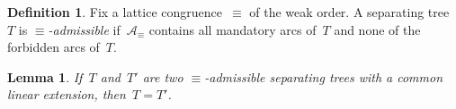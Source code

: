 \documentclass{amsart}
\newtheorem{lemma}[theorem]{Lemma}
\theoremstyle{definition}
\newtheorem{definition}[theorem]{Definition}
\newcommand{\darkblue}{\color{darkblue}} %
\newcommand{\defn}[1]{\textsl{\darkblue #1}} %
\newcommand{\arcs}{{\mathcal{A}}} %
\begin{document}
%

\begin{definition}
\label{def:admissibleSeparatingTrees}
Fix a lattice congruence~$\equiv$ of the weak order.
A separating tree~$T$ is \defn{$\equiv$-admissible} if~$\arcs_\equiv$ contains all mandatory arcs of~$T$ and none of the forbidden arcs of~$T$.
\end{definition}

\begin{lemma}
\label{lem:admissibleSeparatingTreesWithCommonLinearExtensions}
If~$T$ and~$T'$ are two $\equiv$-admissible separating trees with a common linear extension, then~${T = T'}$.
\end{lemma}
\end{document}
